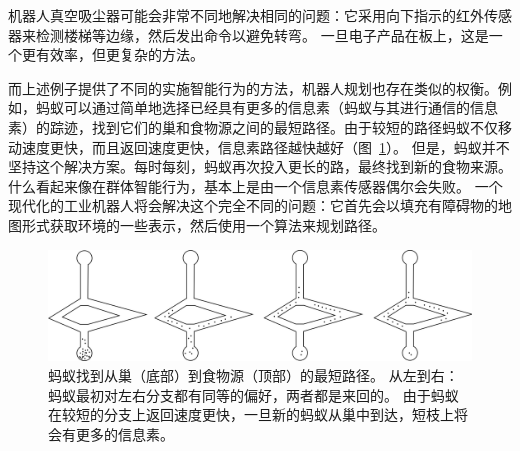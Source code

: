 
机器人真空吸尘器可能会非常不同地解决相同的问题：它采用向下指示的红外传感器来检测楼梯等边缘，然后发出命令以避免转弯。 一旦电子产品在板上，这是一个更有效率，但更复杂的方法。


而上述例子提供了不同的实施智能行为的方法，机器人规划也存在类似的权衡。例如，蚂蚁可以通过简单地选择已经具有更多的信息素（蚂蚁与其进行通信的信息素）的踪迹，找到它们的巢和食物源之间的最短路径。由于较短的路径蚂蚁不仅移动速度更快，而且返回速度更快，信息素路径越快越好（图~\ref{fig:ants}）。 但是，蚂蚁并不坚持这个解决方案。每时每刻，蚂蚁再次投入更长的路，最终找到新的食物来源。什么看起来像在群体智能行为，基本上是由一个信息素传感器偶尔会失败。 一个现代化的工业机器人将会解决这个完全不同的问题：它首先会以填充有障碍物的地图形式获取环境的一些表示，然后使用一个算法来规划路径。

\begin{figure}
	\centering
		\includegraphics[width=\textwidth]{figs/ants.png}
	\caption{蚂蚁找到从巢（底部）到食物源（顶部）的最短路径。 从左到右：蚂蚁最初对左右分支都有同等的偏好，两者都是来回的。 由于蚂蚁在较短的分支上返回速度更快，一旦新的蚂蚁从巢中到达，短枝上将会有更多的信息素。}
	\label{fig:ants}
\end{figure}

